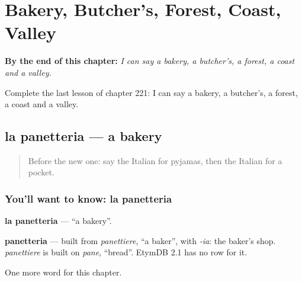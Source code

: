 
\chapter{Bakery, Butcher's, Forest, Coast, Valley}
\label{ch:it-bakery-butcher-s-forest-coast-valley}

\begin{chapteropening}
\textbf{By the end of this chapter:} \emph{I can say a bakery, a butcher's, a forest, a coast and a valley.}

Complete the last lesson of chapter 221: I can say a bakery, a butcher's, a forest, a coast and a valley.
\end{chapteropening}

\section[la panetteria]{la panetteria — a bakery}

\label{lesson:IT-C221-panetteria}



\begin{quote}
Before the new one: say the Italian for pyjamas, then the Italian for a pocket.
\end{quote}

\subsection*{You'll want to know: la panetteria}
\textbf{la panetteria} — \textquotedblleft{}a bakery\textquotedblright{}.

\begin{cousinweb}
\textbf{panetteria} — built from \emph{panettiere}, \textquotedblleft{}a baker\textquotedblright{}, with \emph{-ia}: the baker's shop. \emph{panettiere} is built on \emph{pane}, \textquotedblleft{}bread\textquotedblright{}. EtymDB 2.1 has no row for it.
\end{cousinweb}

\begin{grammarlens}[title={What you've built}]
One more word for this chapter.
\end{grammarlens}

